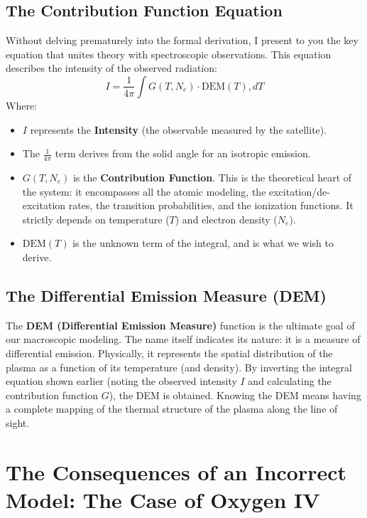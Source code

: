     \subsection{The Contribution Function Equation}
    
    Without delving prematurely into the formal derivation, I present to you the key equation that unites theory with spectroscopic observations. This equation describes the intensity of the observed radiation:
    \begin{equation}
    I = \frac{1}{4\pi} \int G(T, N_e) \cdot \text{DEM}(T) , dT
    \end{equation}
    Where:
    \begin{itemize}
        \item $I$ represents the \textbf{Intensity} (the observable measured by the satellite).
        \item The $\frac{1}{4\pi}$ term derives from the solid angle for an isotropic emission.
        \item $G(T, N_e)$ is the \textbf{Contribution Function}. This is the theoretical heart of the system: it encompasses all the atomic modeling, the excitation/de-excitation rates, the transition probabilities, and the ionization functions. It strictly depends on temperature ($T$) and electron density ($N_e$).
        \item $\text{DEM}(T)$ is the unknown term of the integral, and is what we wish to derive.
    \end{itemize}
    
    \subsection{The Differential Emission Measure (DEM)}
    
    The \textbf{DEM (Differential Emission Measure)} function is the ultimate goal of our macroscopic modeling. The name itself indicates its nature: it is a measure of differential emission. Physically, it represents the spatial distribution of the plasma as a function of its temperature (and density). By inverting the integral equation shown earlier (noting the observed intensity $I$ and calculating the contribution function $G$), the DEM is obtained. Knowing the DEM means having a complete mapping of the thermal structure of the plasma along the line of sight.
    
\section{The Consequences of an Incorrect Model: The Case of Oxygen IV}

